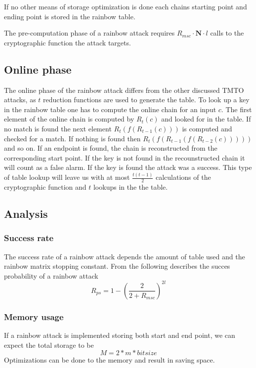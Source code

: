 If no other means of storage optimization is done each chains
starting point and ending point is stored in the rainbow table.

The pre-computation phase of a rainbow attack requires
$R_{msc} \cdot \textbf{N} \cdot l$ calls to the cryptographic function the attack targets.

\subsection{Online phase}
\label{sec:onlinerb}

The online phase of the rainbow attack differs from the other
discussed TMTO attacks, as $t$ reduction functions are used to
generate the table. To look up a key in the rainbow table one has to
compute the online chain for an input $c$. The first element of
the online chain is computed by $R_t(c)$ and looked for in the
table. If no match is found the next element $R_t(f(R_{t-1}(c)))$ is
computed and checked for a match. If nothing is found then $R_t(f(R_{t-1}(f(R_{t-2}(c)))))$
and so on. If an endpoint is found, the chain is reconstructed from the corresponding start
point. If the key is not found in the recounstructed chain it will count
as a false alarm. If the key is found the attack was a
success. This type of table lookup will leave us with at most
$\frac{t(t - 1)}{2}$ calculations of the cryptographic function and
$t$ lookups in the the table.
\subsection{Analysis}

\subsubsection{Success rate}

The success rate of a rainbow attack depends the amount of table used
and the rainbow matrix stopping constant. From \cite[Proposition
29]{176} the following describes the succes probability of a rainbow attack
\[R_{ps} = 1 - \left( \frac{2}{2+R_{msc}} \right)^{2l}\]

\subsubsection{Memory usage}

If a rainbow attack is implemented storing both start and end point,
we can expect the total storage to be
 \[M = 2 * m * bitsize\]
Optimizations can be done to the memory and result in saving
space.




